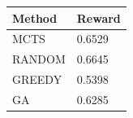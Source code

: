 \begin{tabular}{ll}
\hline
Method & Reward \\
\hline
  MCTS & 0.6529 \\
  RANDOM & 0.6645 \\
  GREEDY & 0.5398 \\
  GA & 0.6285 \\
\hline
\end{tabular}
